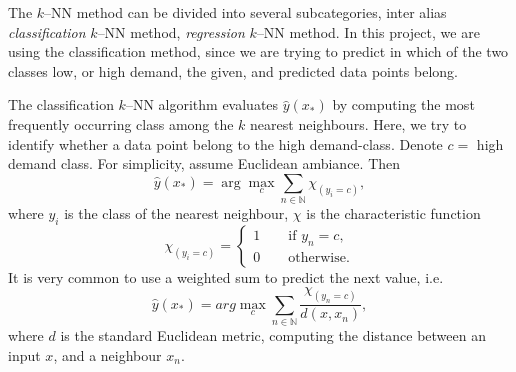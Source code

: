         The $k$--NN method can be divided into several subcategories, inter alias \emph{classification} $k$--NN method, \emph{regression}  $k$--NN method. In this project, we are using the classification method, since we are trying to predict in which of the two classes low, or high demand, the given, and predicted data points belong.
    
        The classification  $k$--NN algorithm evaluates $\hat{y}(x_{*})$ by computing the most frequently occurring class among the $k$ nearest neighbours. Here, we try to identify whether a data point belong to the high demand-class. Denote $c=$ high demand class. For simplicity, assume Euclidean ambiance. Then
            \begin{equation*}
                \hat{y}(x_*) = \arg \max_{c}  \sum_{n \in \mathbb{N}} \chi_{(y_i = c)} ,
            \end{equation*}
        where $y_i$ is the class of the nearest neighbour,  $\chi$ is the characteristic function 
            \begin{equation*}
                \chi_{(y_i = c)} = 
                \begin{cases}
                    1 \qquad \text{if } y_n = c, \\
                    0 \qquad \text{otherwise}.
                    
                \end{cases}
            \end{equation*}
        It is very common to use a weighted sum to predict the next value, i.e.
            \begin{equation*}
                \hat{y}(x_*) =  arg \max_{c}  \sum_{n \in \mathbb{N}} \frac{\chi_{(y_n = c)}}{d(x, x_n)},
            \end{equation*}
        where $d$ is the standard Euclidean metric, computing the distance between an input $x$, and a neighbour $x_n$. 
    








